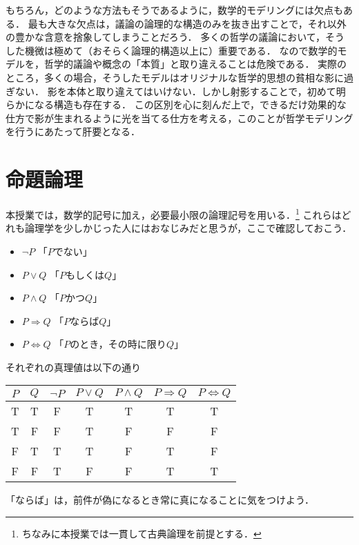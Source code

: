 \documentclass[11pt,a4paper]{jsarticle}
\begin{document}
もちろん，どのような方法もそうであるように，数学的モデリングには欠点もある．
最も大きな欠点は，議論の論理的な構造のみを抜き出すことで，それ以外の豊かな含意を捨象してしまうことだろう．
多くの哲学の議論において，そうした機微は極めて（おそらく論理的構造以上に）重要である．
なので数学的モデルを，哲学的議論や概念の「本質」と取り違えることは危険である．
実際のところ，多くの場合，そうしたモデルはオリジナルな哲学的思想の貧相な影に過ぎない．
影を本体と取り違えてはいけない．しかし射影することで，初めて明らかになる構造も存在する．
この区別を心に刻んだ上で，できるだけ効果的な仕方で影が生まれるように光を当てる仕方を考える，このことが哲学モデリングを行うにあたって肝要となる．



\section{命題論理}
本授業では，数学的記号に加え，必要最小限の論理記号を用いる．\footnote{ちなみに本授業では一貫して古典論理を前提とする．}
これらはどれも論理学を少しかじった人にはおなじみだと思うが，ここで確認しておこう．

\begin{itemize}
 \item $\neg P$ 「$P$でない」
 \item $P \vee Q$ 「$P$もしくは$Q$」
 \item $P \wedge Q$ 「$P$かつ$Q$」
 \item $P \Rightarrow Q$ 「$P$ならば$Q$」
 \item $P \iff Q$ 「$P$のとき，その時に限り$Q$」
\end{itemize}

それぞれの真理値は以下の通り

\begin{table}[h]
\centering
\begin{tabular}{cc|ccccc} \hline
 $P$ & $Q$ & $\neg P$ & $P \vee Q$ & $P \wedge Q$ & $P \Rightarrow Q$ & $P \iff Q$ \\ \hline 
 T  & T & F & T & T & T & T \\
 T  & F & F & T & F & F & F \\
 F  & T & T & T & F & T & F \\
 F  & F & T & F & F & T & T \\ \hline
\end{tabular} 
\end{table}

\begin{attn}
「ならば」は，前件が偽になるとき常に真になることに気をつけよう．
\end{attn}
\end{document}
